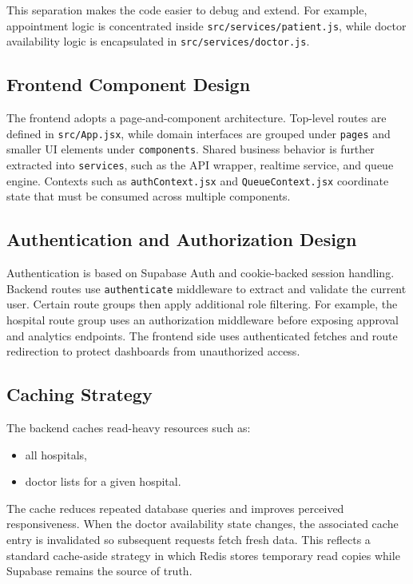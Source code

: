 \documentclass[12pt,onecolumn]{IEEEtran}
\begin{document}
This separation makes the code easier to debug and extend. For example, appointment logic is concentrated inside \texttt{src/services/patient.js}, while doctor availability logic is encapsulated in \texttt{src/services/doctor.js}.

\subsection{Frontend Component Design}
The frontend adopts a page-and-component architecture. Top-level routes are defined in \texttt{src/App.jsx}, while domain interfaces are grouped under \texttt{pages} and smaller UI elements under \texttt{components}. Shared business behavior is further extracted into \texttt{services}, such as the API wrapper, realtime service, and queue engine. Contexts such as \texttt{authContext.jsx} and \texttt{QueueContext.jsx} coordinate state that must be consumed across multiple components.

\subsection{Authentication and Authorization Design}
Authentication is based on Supabase Auth and cookie-backed session handling. Backend routes use \texttt{authenticate} middleware to extract and validate the current user. Certain route groups then apply additional role filtering. For example, the hospital route group uses an authorization middleware before exposing approval and analytics endpoints. The frontend side uses authenticated fetches and route redirection to protect dashboards from unauthorized access.

\subsection{Caching Strategy}
The backend caches read-heavy resources such as:
\begin{itemize}
    \item all hospitals,
    \item doctor lists for a given hospital.
\end{itemize}

The cache reduces repeated database queries and improves perceived responsiveness. When the doctor availability state changes, the associated cache entry is invalidated so subsequent requests fetch fresh data. This reflects a standard cache-aside strategy in which Redis stores temporary read copies while Supabase remains the source of truth.
\end{document}
